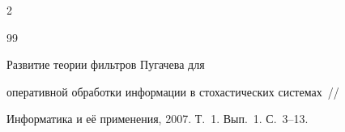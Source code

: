 \begin{multicols}{2}
{{\begin{thebibliography}{99}
 \label{end\stat}







 Развитие теории фильтров Пугачева для


оперативной обработки информации в стохастических сис\-те\-мах~//


Информатика и её применения, 2007. Т.~1. Вып.~1. С.~3--13.


 \end{thebibliography}


}


}








\end{multicols}  


